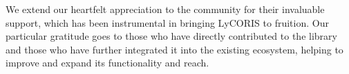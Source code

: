 We extend our heartfelt appreciation to the community for their invaluable support, which has been instrumental in bringing LyCORIS to fruition. Our particular gratitude goes to those who have directly contributed to the library and those who have further integrated it into the existing ecosystem, helping to improve and expand its functionality and reach.